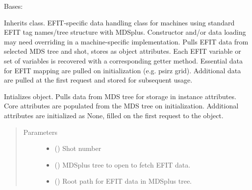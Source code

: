 \documentclass[letterpaper,10pt,english]{sphinxmanual}
\begin{document}
\begin{fulllineitems}
\label{\detokenize{eqtools:eqtools.EFIT.EFITTree}}
Bases: {\hyperref[\detokenize{eqtools:eqtools.core.Equilibrium}]{}}

Inherits {\hyperref[\detokenize{eqtools:eqtools.core.Equilibrium}]{}} class.
EFIT-specific data handling class for machines using standard EFIT tag
names/tree structure with MDSplus.  Constructor and/or data loading may
need overriding in a machine-specific implementation.  Pulls EFIT data
from selected MDS tree and shot, stores as object attributes.  Each EFIT
variable or set of variables is recovered with a corresponding getter
method.  Essential data for EFIT mapping are pulled on initialization
(e.g. psirz grid).  Additional data are pulled at the first request and
stored for subsequent usage.

Intializes {\hyperref[\detokenize{eqtools:eqtools.EFIT.EFITTree}]{}} object. Pulls data from MDS tree for
storage in instance attributes. Core attributes are populated from the MDS
tree on initialization. Additional attributes are initialized as None,
filled on the first request to the object.
\begin{quote}\begin{description}
\item[{Parameters}] \leavevmode\begin{itemize}
\item {} 
 () \textendash{} Shot number

\item {} 
 () \textendash{} MDSplus tree to open to fetch EFIT data.

\item {} 
 () \textendash{} Root path for EFIT data in MDSplus tree.


\end{itemize}
\end{description}
\end{quote}
\end{fulllineitems}
\end{document}
